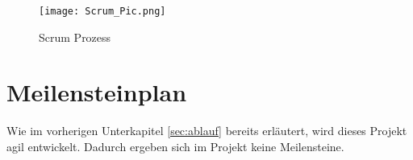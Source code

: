 \begin{figure}[h]
\centering
\texttt{[image: Scrum\_Pic.png]}
\caption{Scrum Prozess}
\label{fib:Scrum}
\end{figure}

\section{Meilensteinplan}
Wie im vorherigen Unterkapitel \ref{sec:ablauf} bereits erläutert, wird dieses Projekt agil entwickelt. Dadurch ergeben sich im Projekt keine Meilensteine.